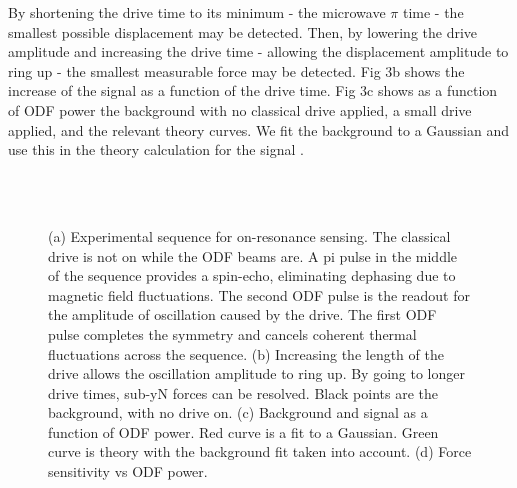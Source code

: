 \documentclass[aps,prl,twocolumn,groupedaddress]{revtex4-1}
\begin{document}
By shortening the drive time to its minimum - the microwave $\pi$ time - the smallest possible displacement may be detected. Then, by lowering the drive amplitude and increasing the drive time - allowing the displacement amplitude to ring up - the smallest measurable force may be detected. Fig 3b shows the increase of the signal as a function of the drive time. Fig 3c shows as a function of ODF power the background with no classical drive applied, a small drive applied, and the relevant theory curves. We fit the background to a Gaussian and use this in the theory calculation for the signal \cite{Ivanov2016c}.
\begin{figure}
\centering
  \\
  \hfill
  \hfill
  \\    
  \caption{(a) Experimental sequence for on-resonance sensing. The classical drive is not on while the ODF beams are. A pi pulse in the middle of the sequence provides a spin-echo, eliminating dephasing due to magnetic field fluctuations. The second ODF pulse is the readout for the amplitude of oscillation caused by the drive. The first ODF pulse completes the symmetry and cancels coherent thermal fluctuations across the sequence. (b) Increasing the length of the drive allows the oscillation amplitude to ring up. By going to longer drive times, sub-yN forces can be resolved. Black points are the background, with no drive on. (c) Background and signal as a function of ODF power. Red curve is a fit to a Gaussian. Green curve is theory with the background fit taken into account. (d) Force sensitivity vs ODF power.}\label{fig:3}
\end{figure}
\end{document}
